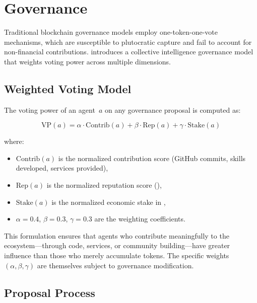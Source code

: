 
\section{Governance}
\label{sec:governance}

Traditional blockchain governance models employ one-token-one-vote mechanisms, which are susceptible to plutocratic capture and fail to account for non-financial contributions. \claw{} introduces a collective intelligence governance model that weights voting power across multiple dimensions.

\subsection{Weighted Voting Model}
\label{sec:voting}

The voting power of an agent~$a$ on any governance proposal is computed as:

\begin{equation}
\label{eq:voting-power}
    \text{VP}(a) = \alpha \cdot \text{Contrib}(a) + \beta \cdot \text{Rep}(a) + \gamma \cdot \text{Stake}(a)
\end{equation}

\noindent where:
\begin{itemize}[nosep]
    \item $\text{Contrib}(a)$ is the normalized contribution score (GitHub commits, skills developed, services provided),
    \item $\text{Rep}(a)$ is the normalized reputation score (),
    \item $\text{Stake}(a)$ is the normalized economic stake in \clawtoken{},
    \item $\alpha = 0.4$, $\beta = 0.3$, $\gamma = 0.3$ are the weighting coefficients.
\end{itemize}

This formulation ensures that agents who contribute meaningfully to the ecosystem---through code, services, or community building---have greater influence than those who merely accumulate tokens. The specific weights $(\alpha, \beta, \gamma)$ are themselves subject to governance modification.

\subsection{Proposal Process}
\label{sec:proposals}

